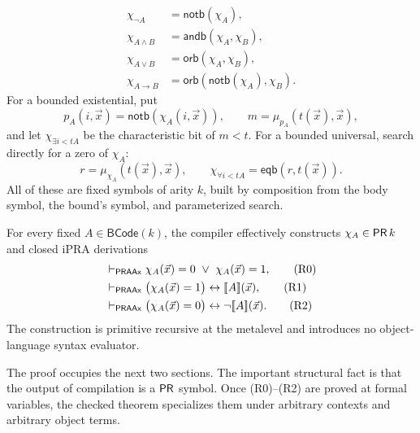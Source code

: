 \begin{align*}
 \chi_{\neg A} &= \mathsf{notb}(\chi_A),\\
 \chi_{A\wedge B} &= \mathsf{andb}(\chi_A,\chi_B),\\
 \chi_{A\vee B} &= \mathsf{orb}(\chi_A,\chi_B),\\
 \chi_{A\to B} &= \mathsf{orb}(\mathsf{notb}(\chi_A),\chi_B).
\end{align*}
For a bounded existential, put
\[
  p_A(i,\vec x)=\mathsf{notb}(\chi_A(i,\vec x)),
  \qquad m=\mu_{p_A}(t(\vec x),\vec x),
\]
and let \(\chi_{\exists i<t A}\) be the characteristic bit of \(m<t\).
For a bounded universal, search directly for a zero of \(\chi_A\):
\[
  r=\mu_{\chi_A}(t(\vec x),\vec x),
  \qquad
  \chi_{\forall i<t A}=\mathsf{eqb}(r,t(\vec x)).
\]
All of these are fixed symbols of arity \(k\), built by composition from the
body symbol, the bound's  symbol, and parameterized search.

\begin{theorem}
\label{thm:reflection}
For every fixed \(A\in\mathsf{BCode}(k)\), the compiler effectively constructs
\(\chi_A\in\mathsf{PR}\,k\) and closed iPRA derivations
\begin{align*}
 &\mathrel{\vdash_{\mathsf{PRAAx}}} \chi_A(\vec x)=0\ \vee\ \chi_A(\vec x)=1,
       \tag{R0}\\
 &\mathrel{\vdash_{\mathsf{PRAAx}}}
   \bigl(\chi_A(\vec x)=1\bigr)
       \leftrightarrow \mathopen{[\![} A\mathclose{]\!]}(\vec x),
       \tag{R1}\\
 &\mathrel{\vdash_{\mathsf{PRAAx}}}
   \bigl(\chi_A(\vec x)=0\bigr)
       \leftrightarrow \neg\mathopen{[\![} A\mathclose{]\!]}(\vec x).
       \tag{R2}
\end{align*}
The construction is primitive recursive at the metalevel and introduces no
object-language syntax evaluator.
\end{theorem}

The proof occupies the next two sections.  The important structural fact is
that the output of compilation is a \(\mathsf{PR}\) symbol.  Once (R0)--(R2) are
proved at formal variables, the checked  theorem specializes them
under arbitrary contexts and arbitrary object terms.
